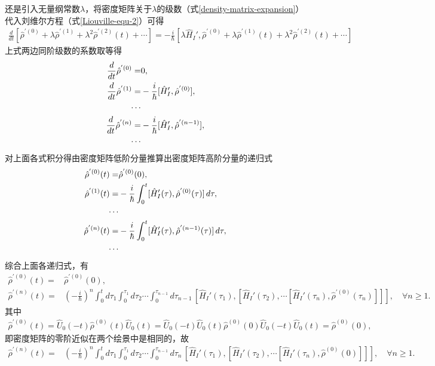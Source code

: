 \documentclass{assignment}
\begin{document}
还是引入无量纲常数$\lambda$，将密度矩阵关于$\lambda$的级数（式\eqref{density-matrix-expansion}）代入刘维尔方程（式\eqref{Liouville-equ-2}）可得
\begin{align}
    \frac{d}{dt}[\hat{\rho}^{'(0)}+\lambda\hat{\rho}^{'(1)}+\lambda^2\hat{\rho}^{'(2)}(t)+\cdots]=-\frac{i}{\hbar}\left[\lambda\hat{H}_I',\hat{\rho}^{'(0)}+\lambda\hat{\rho}^{'(1)}(t)+\lambda^2\hat{\rho}^{'(2)}(t)+\cdots\right]
\end{align}
上式两边同阶级数的系数取等得
\begin{align}
    \frac{d}{dt}\hat{\rho}^{'(0)}=&0,\\
    \frac{d}{dt}\hat{\rho}^{'(1)}=&-\frac{i}{\hbar}[\hat{H}_I',\hat{\rho}^{'(0)}],\\
    \notag\cdots&\\
    \frac{d}{dt}\hat{\rho}^{'(n)}=&-\frac{i}{\hbar}[\hat{H}_I',\hat{\rho}^{'(n-1)}],\\
    \notag\cdots&
\end{align}
对上面各式积分得由密度矩阵低阶分量推算出密度矩阵高阶分量的递归式
\begin{align}
    \hat{\rho}^{'(0)}(t)=&\hat{\rho}^{'(0)}(0),\\
    \hat{\rho}^{'(1)}(t)=&-\frac{i}{\hbar}\int_0^t[\hat{H}_I'(\tau),\hat{\rho}^{'(0)}(\tau)]\,d\tau,\\
    \notag\cdots&\\
    \hat{\rho}^{'(n)}(t)=&-\frac{i}{\hbar}\int_0^t[\hat{H}_I'(\tau),\hat{\rho}^{'(n-1)}(\tau)]\,d\tau,\\
    \notag\cdots&
\end{align}
综合上面各递归式，有
\begin{align}
    \hat{\rho}^{'(0)}(t)=&\hat{\rho}^{'(0)}(0),\\
    \hat{\rho}^{'(n)}(t)=&\left(-\frac{i}{\hbar}\right)^n\int_0^td\tau_1\int_0^{\tau_1}d\tau_2\cdots\int_0^{\tau_{n-1}}d\tau_{n-1}\,\left[\hat{H}_I'(\tau_1),\left[\hat{H}_I'(\tau_2),\cdots\left[\hat{H}_I'(\tau_n),\hat{\rho}^{'(0)}(\tau_n)\right]\right]\right],\quad\forall n\geq 1.
\end{align}
其中
\begin{align}
    \hat{\rho}^{'(0)}(t)=\hat{U}_0(-t)\hat{\rho}^{(0)}(t)\hat{U}_0(t)=\hat{U}_0(-t)\hat{U}_0(t)\hat{\rho}^{(0)}(0)\hat{U}_0(-t)\hat{U}_0(t)=\hat{\rho}^{(0)}(0),
\end{align}
即密度矩阵的零阶近似在两个绘景中是相同的，故
\begin{align}
    \hat{\rho}^{'(n)}(t)=&\left(-\frac{i}{\hbar}\right)^n\int_0^td\tau_1\int_0^{\tau_1}d\tau_2\cdots\int_0^{\tau_{n-1}}d\tau_n\,\left[\hat{H}_I'(\tau_1),\left[\hat{H}_I'(\tau_2),\cdots\left[\hat{H}_I'(\tau_n),\hat{\rho}^{(0)}(0)\right]\right]\right],\quad\forall n\geq 1.
\end{align}
\end{document}
